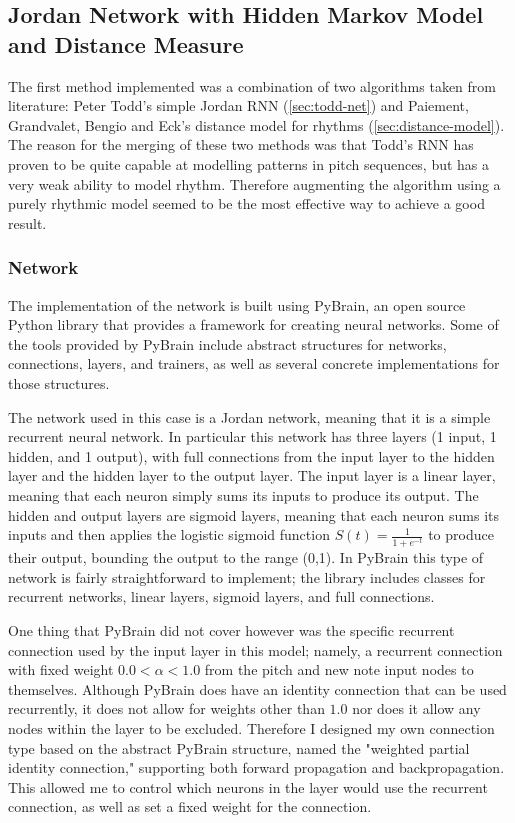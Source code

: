 \documentclass[ author={Stephen Livermore-Tozer},
				supervisor={Dr. Peter Flach},
				degree={MEng},
				title={Algorithmic Co-composition Using Machine Learning},
				subtitle={},
				type={research},
				year={2016} ]{dissertation}
\begin{document}
	\subsection{Jordan Network with Hidden Markov Model and Distance Measure}
	\label{sec:jordan-implementation}
	
	The first method implemented was a combination of two algorithms taken from literature: Peter Todd's simple Jordan RNN (\ref{sec:todd-net}) and Paiement, Grandvalet, Bengio and Eck's distance model for rhythms (\ref{sec:distance-model}). The reason for the merging of these two methods was that Todd's RNN has proven to be quite capable at modelling patterns in pitch sequences, but has a very weak ability to model rhythm. Therefore augmenting the algorithm using a purely rhythmic model seemed to be the most effective way to achieve a good result.
	
	\subsubsection{Network}
	
	The implementation of the network is built using PyBrain, an open source Python library that provides a framework for creating neural networks. Some of the tools provided by PyBrain include abstract structures for networks, connections, layers, and trainers, as well as several concrete implementations for those structures.
	
	The network used in this case is a Jordan network, meaning that it is a simple recurrent neural network. In particular this network has three layers (1 input, 1 hidden, and 1 output), with full connections from the input layer to the hidden layer and the hidden layer to the output layer. The input layer is a linear layer, meaning that each neuron simply sums its inputs to produce its output. The hidden and output layers are sigmoid layers, meaning that each neuron sums its inputs and then applies the logistic sigmoid function $ S(t) = \frac{1}{1 + e^{-t}} $ to produce their output, bounding the output to the range (0,1).
	In PyBrain this type of network is fairly straightforward to implement; the library includes classes for recurrent networks, linear layers, sigmoid layers, and full connections.
	
	One thing that PyBrain did not cover however was the specific recurrent connection used by the input layer in this model; namely, a recurrent connection with fixed weight $0.0 < \alpha < 1.0$ from the pitch and new note input nodes to themselves. Although PyBrain does have an identity connection that can be used recurrently, it does not allow for weights other than $1.0$ nor does it allow any nodes within the layer to be excluded. Therefore I designed my own connection type based on the abstract PyBrain structure, named the "weighted partial identity connection," supporting both forward propagation and backpropagation. This allowed me to control which neurons in the layer would use the recurrent connection, as well as set a fixed weight for the connection.
	
\end{document}
